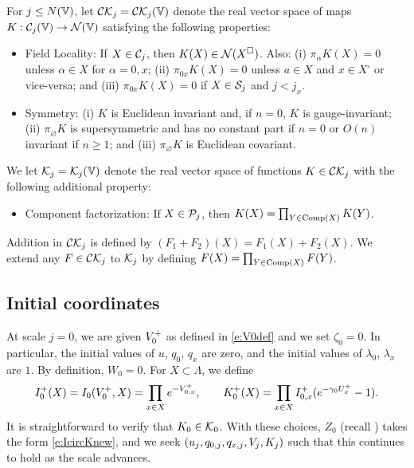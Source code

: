 \begin{defn}
For $j \le N(\mathbb{V})$, let $\mathcal{C}\mathcal{K}_j = \mathcal{C}\mathcal{K}_j(\mathbb{V})$ denote the real
vector space of maps $K : \mathcal{C}_j(\mathbb{V}) \rightarrow \mathcal{N}(\mathbb{V})$ satisfying the following
properties:
\begin{itemize}
\item
Field Locality: If $X \in \mathcal{C}_j$, then $K(X) \in \mathcal{N}(X^\square)$.
Also: (i) $\pi_\alpha K(X) = 0$ unless $\alpha \in X$ for $\alpha = 0, x$;
(ii) $\pi_{0x} K(X) = 0$ unless $a\in X$ and $x \in X^\square$ or vice-versa;
and (iii) $\pi_{0x} K(X) = 0$ if $X \in \mathcal{S}_j$ and $j < j_x$.

\item
Symmetry: (i) $K$ is Euclidean invariant and, if $n = 0$, $K$ is gauge-invariant;
(ii) $\pi_\varnothing K$ is supersymmetric and has no constant part if $n = 0$
or $O(n)$ invariant if $n \ge 1$;
and (iii) $\pi_\varnothing K$ is Euclidean covariant.
\end{itemize}
We let $\mathcal{K}_j = \mathcal{K}_j(\mathbb{V})$ denote the real vector space of functions
$K \in \mathcal{C}\mathcal{K}_j$ with the following additional property:
\begin{itemize}
\item
Component factorization: If $X \in \mathcal{P}_j$, then $K(X) = \prod_{Y\in{\rm Comp}(X)} K(Y)$.
\end{itemize}
\end{defn}

Addition in $\mathcal{C}\mathcal{K}_j$ is defined by $(F_1 + F_2)(X) = F_1(X) + F_2(X)$.
We extend any $F \in \mathcal{C}\mathcal{K}_j$ to $\mathcal{K}_j$ by defining
$F(X) = \prod_{Y\in{\rm Comp}(X)} F(Y)$.

\subsection{Initial coordinates}

At scale $j = 0$, we are given $V^+_0$ as defined in \eqref{e:V0def}
and we set $\zeta_0 = 0$. In particular,
the initial values of $u$, $q_0$, $q_x$ are zero, and the initial values of $\lambda_0$, $\lambda_x$
are $1$. By definition, $W_0 = 0$.
For $X \subset \Lambda$, we define
\begin{equation}
\label{e:IK0def}
I_0^+(X) = I_0(V^+_0, X) = \prod_{x\in X} e^{-V^+_{0,x}},
	\qquad
K_0^+(X) = \prod_{x \in X} I_{0,x}^+ (e^{-\gamma_0 U^{+}_{x}} - 1).
\end{equation}
It is straightforward to verify that $K_0 \in \mathcal{K}_0$.
With these choices, $Z_0$ (recall )
takes the form \eqref{e:IcircKnew}, and we seek
$(u_j, q_{0,j}, q_{x,j}, V_j, K_j)$ such that this continues to hold as the scale advances.

